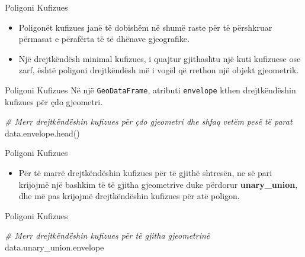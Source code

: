 \documentclass[
  ignorenonframetext,
]{beamer}
\newenvironment{Shaded}{\begin{snugshade}}{\end{snugshade}}
\newcommand{\CommentTok}[1]{\textcolor[rgb]{0.56,0.35,0.01}{\textit{#1}}}
\newcommand{\NormalTok}[1]{#1}
\providecommand{\tightlist}{%
  \setlength{\itemsep}{0pt}\setlength{\parskip}{0pt}}
\begin{document}
\begin{frame}{Poligoni Kufizues}
\protect\hypertarget{poligoni-kufizues}{}
\begin{itemize}
\item
  Poligonët kufizues janë të dobishëm në shumë raste për të përshkruar
  përmasat e përafërta të të dhënave gjeografike.
\item
  Një drejtkëndësh minimal kufizues, i quajtur gjithashtu një kuti
  kufizuese ose zarf, është poligoni drejtkëndësh më i vogël që rrethon
  një objekt gjeometrik.
\end{itemize}
\end{frame}

\begin{frame}[fragile]{Poligoni Kufizues}
\protect\hypertarget{poligoni-kufizues-1}{}
Në një \texttt{GeoDataFrame}, atributi \texttt{envelope} kthen
drejtkëndëshin kufizues për çdo gjeometri.


\begin{Shaded}
\begin{Highlighting}[]
\CommentTok{\# Merr drejtkëndëshin kufizues për çdo gjeometri dhe shfaq vetëm pesë të parat}
\NormalTok{data.envelope.head()}
\end{Highlighting}
\end{Shaded}
\end{frame}

\begin{frame}{Poligoni Kufizues}
\protect\hypertarget{poligoni-kufizues-2}{}
\begin{itemize}
\tightlist
\item
  Për të marrë drejtkëndëshin kufizues për të gjithë shtresën, ne së
  pari krijojmë një bashkim të të gjitha gjeometrive duke përdorur
  \textbf{unary\_union}, dhe më pas krijojmë drejtkëndëshin kufizues për
  atë poligon.
\end{itemize}
\end{frame}

\begin{frame}[fragile]{Poligoni Kufizues}
\protect\hypertarget{poligoni-kufizues-3}{}

\begin{Shaded}
\begin{Highlighting}[]
\CommentTok{\# Merr drejtkëndëshin kufizues për të gjitha gjeometrinë}
\NormalTok{data.unary\_union.envelope}
\end{Highlighting}
\end{Shaded}
\end{frame}
\end{document}
